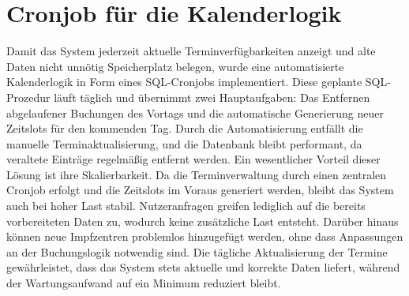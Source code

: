 \section*{Cronjob für die Kalenderlogik}
Damit das System jederzeit aktuelle Terminverfügbarkeiten anzeigt und alte Daten nicht 
unnötig Speicherplatz belegen, wurde eine automatisierte Kalenderlogik in Form eines 
SQL-Cronjobs implementiert. Diese geplante SQL-Prozedur läuft täglich und übernimmt zwei 
Hauptaufgaben: Das Entfernen abgelaufener Buchungen des Vortags und die automatische 
Generierung neuer Zeitslots für den kommenden Tag.
Durch die Automatisierung entfällt die manuelle Terminaktualisierung, und die Datenbank 
bleibt performant, da veraltete Einträge regelmäßig entfernt werden.
Ein wesentlicher Vorteil dieser Lösung ist ihre Skalierbarkeit. Da die Terminverwaltung 
durch einen zentralen Cronjob erfolgt und die Zeitslots im Voraus generiert werden, 
bleibt das System auch bei hoher Last stabil. Nutzeranfragen greifen lediglich auf die 
bereits vorbereiteten Daten zu, wodurch keine zusätzliche Last entsteht.
Darüber hinaus können neue Impfzentren problemlos hinzugefügt werden, ohne dass 
Anpassungen an der Buchungslogik notwendig sind. Die tägliche Aktualisierung der Termine 
gewährleistet, dass das System stets aktuelle und korrekte Daten liefert, während der 
Wartungsaufwand auf ein Minimum reduziert bleibt.
